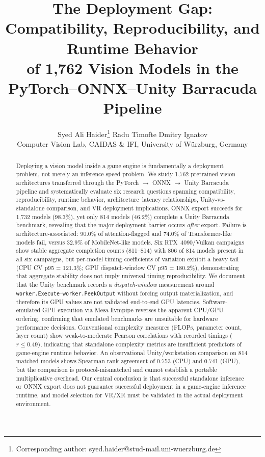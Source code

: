\documentclass[10pt,twocolumn,letterpaper]{article}
\begin{document}
\title{The Deployment Gap: Compatibility, Reproducibility, and Runtime Behavior\\of 1,762 Vision Models in the PyTorch--ONNX--Unity Barracuda Pipeline}
\author{Syed Ali Haider\thanks{Corresponding author: syed.haider@stud-mail.uni-wuerzburg.de} \quad Radu Timofte \quad Dmitry Ignatov\\
\small Computer Vision Lab, CAIDAS \& IFI, University of W\"urzburg, Germany}
\maketitle

\begin{abstract}
Deploying a vision model inside a game engine is fundamentally a deployment problem, not merely an inference-speed problem.
We study 1,762 pretrained vision architectures transferred through the PyTorch $\rightarrow$ ONNX $\rightarrow$ Unity Barracuda pipeline and systematically evaluate six research questions spanning compatibility, reproducibility, runtime behavior, architecture--latency relationships, Unity-vs-standalone comparison, and VR deployment implications.
ONNX export succeeds for 1,732 models (98.3\%), yet only 814 models (46.2\%) complete a Unity Barracuda benchmark, revealing that the major deployment barrier occurs \emph{after} export.
Failure is architecture-associated: 90.0\% of attention-flagged and 74.0\% of Transformer-like models fail, versus 32.9\% of MobileNet-like models.
Six RTX~4090/Vulkan campaigns show stable aggregate completion counts (811--814) with 806 of 814 models present in all six campaigns, but per-model timing coefficients of variation exhibit a heavy tail (CPU CV p95 = 121.3\%; GPU dispatch-window CV p95 = 180.2\%), demonstrating that aggregate stability does not imply universal timing reproducibility.
We document that the Unity benchmark records a \emph{dispatch-window} measurement around \texttt{worker.Execute}--\texttt{worker.PeekOutput} without forcing output materialization, and therefore its GPU values are not validated end-to-end GPU latencies.
Software-emulated GPU execution via Mesa llvmpipe reverses the apparent CPU/GPU ordering, confirming that emulated benchmarks are unsuitable for hardware performance decisions.
Conventional complexity measures (FLOPs, parameter count, layer count) show weak-to-moderate Pearson correlations with recorded timings ($r \leq 0.49$), indicating that standalone complexity metrics are insufficient predictors of game-engine runtime behavior.
An observational Unity/workstation comparison on 814 matched models shows Spearman rank agreement of 0.753 (CPU) and 0.741 (GPU), but the comparison is protocol-mismatched and cannot establish a portable multiplicative overhead.
Our central conclusion is that successful standalone inference or ONNX export does not guarantee successful deployment in a game-engine inference runtime, and model selection for VR/XR must be validated in the actual deployment environment.
\end{abstract}
\end{document}

